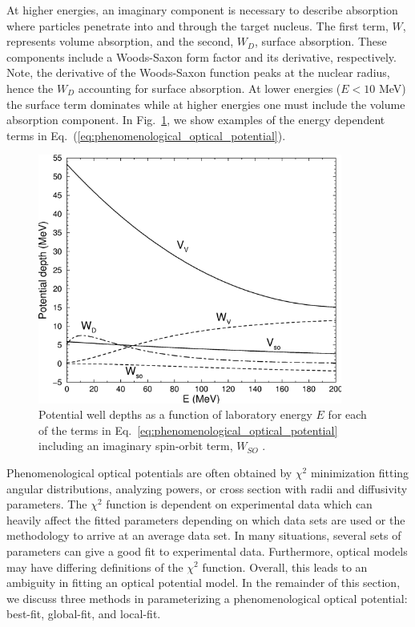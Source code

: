 \documentclass[preprintnumbers,floatfix,aps,prc,preprint,nofootinbib]{revtex4-1}
\begin{document}
At higher energies, an imaginary component is necessary to describe absorption where particles penetrate into and through the target nucleus. The first term, $W$, represents volume absorption, and the second, $W_D$, surface absorption. These components include a Woods-Saxon form factor and its derivative, respectively. Note, the derivative of the Woods-Saxon function peaks at the nuclear radius, hence the $W_D$ accounting for surface absorption. At lower energies ($E < 10$ MeV) the surface term dominates while at higher energies one must include the volume absorption component. In Fig.~\ref{fig:potential_wells_omp}, we show examples of the energy dependent terms in Eq.~(\ref{eq:phenomenological_optical_potential}).
\\

%
\begin{figure}
	\captionsetup{singlelinecheck=false,justification=raggedright}
	\centering
	\includegraphics[width=10cm]{potential_wells_omp}
	\caption{Potential well depths as a function of laboratory energy $E$ for each of the terms in Eq.~\ref{eq:phenomenological_optical_potential} including an imaginary spin-orbit term, $W_{SO}$ \cite{Koning:2003zz}.}
	\label{fig:potential_wells_omp}
\end{figure}
%

Phenomenological optical potentials are often obtained by $\chi^2$ minimization fitting angular distributions, analyzing powers, or cross section with radii and diffusivity parameters. The $\chi^2$ function is dependent on experimental data which can heavily affect the fitted parameters depending on which data sets are used or the methodology to arrive at an average data set. In many situations, several sets of parameters can give a good fit to experimental data. Furthermore, optical models may have differing definitions of the $\chi^2$ function. Overall, this leads to an ambiguity in fitting an optical potential model. In the remainder of this section, we discuss three methods in parameterizing a phenomenological optical potential: best-fit, global-fit, and local-fit.
\\
\end{document}

